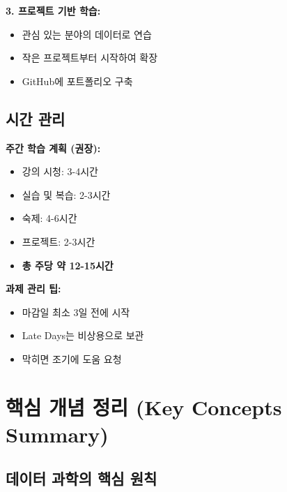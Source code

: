 \documentclass[12pt,a4paper]{article}
\begin{document}
\textbf{3. 프로젝트 기반 학습:}
\begin{itemize}
    \item 관심 있는 분야의 데이터로 연습
    \item 작은 프로젝트부터 시작하여 확장
    \item GitHub에 포트폴리오 구축
\end{itemize}

\subsection{시간 관리}

\textbf{주간 학습 계획 (권장):}
\begin{itemize}
    \item 강의 시청: 3-4시간
    \item 실습 및 복습: 2-3시간
    \item 숙제: 4-6시간
    \item 프로젝트: 2-3시간
    \item \textbf{총 주당 약 12-15시간}
\end{itemize}

\textbf{과제 관리 팁:}
\begin{itemize}
    \item 마감일 최소 3일 전에 시작
    \item Late Days는 비상용으로 보관
    \item 막히면 조기에 도움 요청
\end{itemize}

\section{핵심 개념 정리 (Key Concepts Summary)}

\subsection{데이터 과학의 핵심 원칙}
\end{document}
